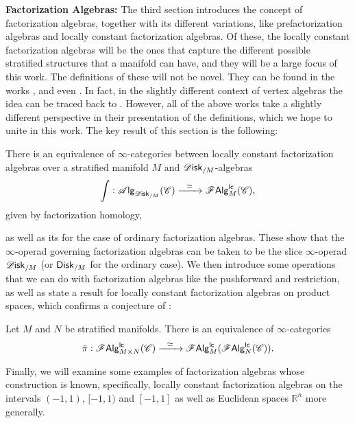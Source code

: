 \documentclass[../text]{subfiles}
\begin{document}
\textbf{ Factorization Algebras:} The third section introduces the concept of factorization algebras, together with its different variations, like prefactorization algebras and locally constant factorization algebras. Of these, the locally constant factorization algebras will be the ones that capture the different possible stratified structures that a manifold can have, and they will be a large focus of this work. The definitions of these will not be novel. They can be found in the works \cite{cg2016}, \cite{ginot2015} and even \cite{af_primer}. In fact, in the slightly different context of vertex algebras the idea can be traced back to \cite{bd2004}. However, all of the above works take a slightly different perspective in their presentation of the definitions, which we hope to unite in this work. The key result of this section is the following:
%
\begin{theorem*}[\ref{thm:disk_alg=lcfa}]
    There is an equivalence of $\infty$-categories between locally constant factorization algebras over a stratified manifold $M$ and $\disk_{/M}$-algebras
    \begin{equation}
        \int: \alg{\disk_{/M}} (\catC) \xrightarrow{\ \ \simeq \ \ } \lcfa_M (\catC),
    \end{equation}
    given by factorization homology,
\end{theorem*}
%
as well as its  for the case of ordinary factorization algebras. These show that the $\infty$-operad governing factorization algebras can be taken to be the slice $\infty$-operad $\disk_{/M}$ (or $\disk[r]_{/M}$ for the ordinary case). We then introduce some operations that we can do with factorization algebras like the pushforward and restriction, as well as state a result for locally constant factorization algebras on product spaces, which confirms a conjecture of \cite{ginot2015}:
%
\begin{proposition*}[\ref{prop:exp_of_products_lc}]
    Let $M$ and $N$ be stratified manifolds. There is an equivalence of $\infty$-categories
    \begin{equation}
        \bar{\pi}: \mathscr{F} \mathsf{Alg}^{\mathsf{lc}}_{M \times N}(\mathscr{C}) \xrightarrow{\ \ \simeq \ \ } \mathscr{F} \mathsf{Alg}^{\mathsf{lc}}_{M}(\mathscr{F} \mathsf{Alg}^{\mathsf{lc}}_{N}(\mathscr{C})).
    \end{equation}
\end{proposition*}
%
Finally, we will examine some examples of factorization algebras whose construction is known, specifically, locally constant factorization algebras on the intervals $(-1,1)$, $[-1,1)$ and $[-1,1]$ as well as Euclidean spaces $\mathbb{R}^n$ more generally.
\end{document}
